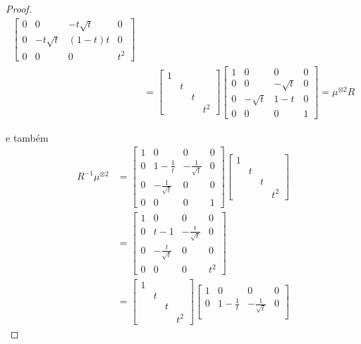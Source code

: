 \begin{proof}
\begin{align*}
\begin{bmatrix}
		0 & 0 & -t\sqrt{t} & 0 \\
		0 & -t\sqrt{t} & (1-t)t &  0 \\
		0 & 0 & 0 & t^2
		\end{bmatrix} \\
		&= \begin{bmatrix}
		1 \\
		& t \\
		& & t \\
		& & & t^2
		\end{bmatrix}\begin{bmatrix}
		1 & 0 & 0 & 0 \\
		0 & 0 & -\sqrt{t} & 0 \\
		0 & -\sqrt{t} & 1-t & 0 \\
		0 & 0 & 0 & 1
		\end{bmatrix} 
		= \mu^{\otimes 2}R
		\end{align*}
		\par\vspace{0.3cm} e também
		\begin{align*}
		R^{-1}\mu^{\otimes 2} &= \begin{bmatrix}
		1 & 0 & 0 & 0 \\
		0 & 1 - \frac{1}{t} & -\frac{1}{\sqrt{t}} & 0 \\
		0 & -\frac{1}{\sqrt{t}} & 0 & 0 \\
		0 & 0 & 0 & 1
		\end{bmatrix}\begin{bmatrix}
		1 \\
		& t \\
		& & t \\
		& & & t^2
		\end{bmatrix} \\
		&= \begin{bmatrix}
		1 & 0 & 0 & 0 \\
		0 & t-1 & -\frac{t}{\sqrt{t}} & 0 \\
		0 & -\frac{t}{\sqrt{t}} & 0 &  0 \\
		0 & 0 & 0 & t^2
		\end{bmatrix} \\
		&= \begin{bmatrix}
		1 \\
		& t \\
		& & t \\
		& & & t^2
		\end{bmatrix}\begin{bmatrix}
		1 & 0 & 0 & 0 \\
		0 & 1 - \frac{1}{t} & -\frac{1}{\sqrt{t}} & 0 \\

\end{bmatrix}
\end{align*}
\end{proof}
